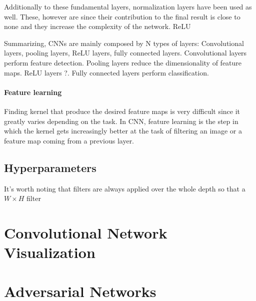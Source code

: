 Additionally to these fundamental layers, normalization layers have been used as well.
These, however are  since their contribution to the final result is close to none and they increase the complexity of the network.
ReLU \cite{Krizhevsky2012,Nair2010}




Summarizing, CNNs are mainly composed by N types of layers: Convolutional layers, pooling layers, ReLU layers, fully connected layers.
Convolutional layers perform feature detection.
Pooling layers reduce the dimensionality of feature maps.
ReLU layers ?.
Fully connected layers perform classification.

\paragraph{Feature learning}
Finding kernel that produce the desired feature maps is very difficult since it greatly varies depending on the task.
In CNN, feature learning is the step in which the kernel gets increasingly better at the task of filtering an image or a feature map coming from a previous layer.
\todo[inline]

\subsection{Hyperparameters}
\label{sub:concepts:hyperparameters}

It's worth noting that filters are always applied over the whole depth so that a ${W}\times{H}$ filter



\section{Convolutional Network Visualization}
\label{sec:concepts:netvis}



\section{Adversarial Networks}
\label{sec:concepts:adversarialnet}



